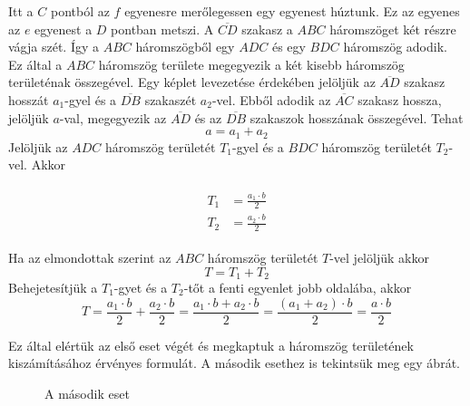 \documentclass[11pt, a4paper]{article}
\begin{document}
Itt a $C$ pontb\'ol az $f$ egyenesre mer\H{o}legessen egy egyenest h\'uztunk. Ez az egyenes az $e$ egyenest a $D$ pontban metszi. A $\overline{CD}$ szakasz a $ABC$ h\'aromszöget k\'et r\'eszre v\'agja sz\'et. \'Igy a $ABC$ h\'aromszögb\H{o}l egy $ADC$ \'es egy $BDC$ h\'aromszög adodik. Ez \'altal a $ABC$ h\'aromszög területe megegyezik a k\'et kisebb h\'aromszög terület\'enak összeg\'evel. Egy k\'eplet levezet\'ese \'erdek\'eben jelöljük az $\overline{AD}$ szakasz hossz\'at $a_1$-gyel \'es a $\overline{DB}$ szakasz\'et $a_2$-vel. Ebb\H{o}l adodik az $\overline{AC}$ szakasz hossza, jelöljük $a$-val, megegyezik az $\overline{AD}$ \'es az $\overline{DB}$ szakaszok hossz\'anak összeg\'evel. Tehat
\[
a = a_1 + a_2
\]
Jelöljük az $ADC$ h\'aromszög terület\'et $T_1$-gyel \'es a $BDC$ h\'aromszög terület\'et $T_2$-vel. Akkor

\begin{align}
 \begin{aligned}
     T_1 &= \frac{a_1\cdot b}{2} \\
     T_2 &= \frac{a_2\cdot b}{2}
 \end{aligned}
 \end{align}

 Ha az elmondottak szerint az $ABC$ h\'aromszög terület\'et $T$-vel jelöljük akkor
 \[
  T = T_1 + T_2
 \]
Behejetes\'itjük a $T_1$-gyet \'es a $T_2$-t\H{o}t a fenti egyenlet jobb oldal\'aba, akkor
 \[
     T = \frac{a_1\cdot b}{2} + \frac{a_2\cdot b}{2} = \frac{a_1\cdot b + a_2\cdot b}{2} = \frac{(a_1 + a_2) \cdot b}{2} = \frac{a\cdot b}{2}
 \]

Ez \'altal el\'ertük az els\H{o} eset v\'eg\'et \'es megkaptuk a h\'aromszög terület\'enek kisz\'am\'it\'as\'ahoz \'erv\'enyes formul\'at.
\newpage
A m\'asodik esethez is tekintsük meg egy \'abr\'at.

\begin{figure}[h]
\centering
{}
    \caption{A m\'asodik eset}
\label{fig:tri6}
\end{figure}
\end{document}
